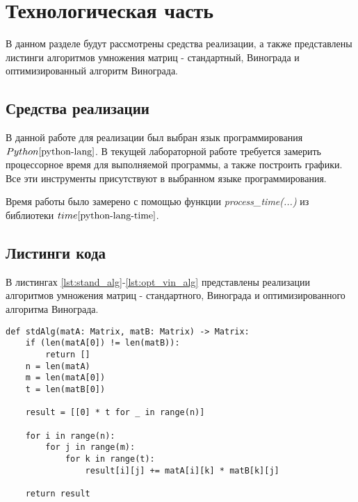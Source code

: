 \chapter{Технологическая часть}

В данном разделе будут рассмотрены средства реализации, а также представлены листинги алгоритмов умножения матриц - стандартный, Винограда и оптимизированный алгоритм Винограда.

\section{Средства реализации}
В данной работе для реализации был выбран язык программирования $Python \cite{python-lang}$. В текущей лабораторной работе требуется замерить процессорное время для выполняемой программы, а также построить графики. Все эти инструменты присутствуют в выбранном языке программирования.

Время работы было замерено с помощью функции \textit{process\_time(...)} из библиотеки $time \cite{python-lang-time}$.


\section{Листинги кода}

В листингах \ref{lst:stand_alg}-\ref{lst:opt_vin_alg} представлены реализации алгоритмов умножения матриц - стандартного, Винограда и оптимизированного алгоритма Винограда.

\begin{center}
    \captionsetup{justification=raggedright,singlelinecheck=off}
    \begin{lstlisting}[label=lst:stand_alg,caption=Стандартный алгоритм умножения матриц]
def stdAlg(matA: Matrix, matB: Matrix) -> Matrix:
	if (len(matA[0]) != len(matB)):
		return []
	n = len(matA)
	m = len(matA[0])
	t = len(matB[0])
	
	result = [[0] * t for _ in range(n)]
	
	for i in range(n):
		for j in range(m):
			for k in range(t):
				result[i][j] += matA[i][k] * matB[k][j]
	
	return result
\end{lstlisting}
\end{center}


